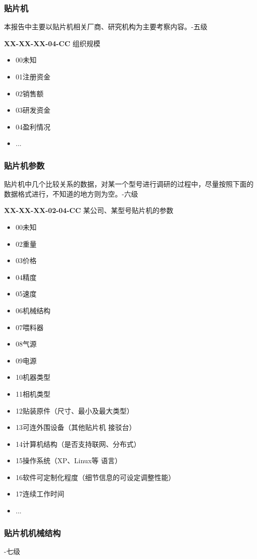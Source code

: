 \documentclass[a4paper,12pt,UTF8]{article}
\begin{document}
\subsubsection{贴片机}
本报告中主要以贴片机相关厂商、研究机构为主要考察内容。-五级

\textbf{XX-XX-XX-04-CC} 组织规模
\begin{itemize}
  \item 00未知%
  \item 01注册资金
  \item 02销售额
  \item 03研发资金
  \item 04盈利情况
  \item ...
\end{itemize}

\subsubsection{贴片机参数}
贴片机中几个比较关系的数据，对某一个型号进行调研的过程中，尽量按照下面的数据格式进行，不知道的地方则为空。-六级

\textbf{XX-XX-XX-02-04-CC} 某公司、某型号贴片机的参数
\begin{itemize}
  \item 00未知%
  \item 02重量
  \item 03价格
  \item 04精度
  \item 05速度
  \item 06机械结构
  \item 07喂料器
  \item 08气源
  \item 09电源
  \item 10机器类型
  \item 11相机类型
  \item 12贴装原件（尺寸、最小及最大类型）
  \item 13可连外围设备（其他贴片机 接驳台）
  \item 14计算机结构（是否支持联网、分布式）
  \item 15操作系统（XP、Linux等 语言）
  \item 16软件可定制化程度（细节信息的可设定调整性能）
  \item 17连续工作时间
  \item ...
\end{itemize}

\subsubsection{贴片机机械结构}
-七级
\end{document}
